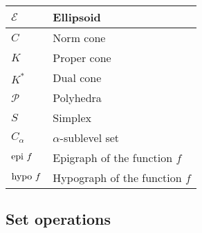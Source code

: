 \documentclass{article}
\begin{document}
\begin{xltabular}{\textwidth}{XX}
    \(\mathcal{E}\) & Ellipsoid \\ \hline
    \(C\) & Norm cone \\ \hline
    \(K\) & Proper cone \\ \hline
    \(K^*\) & Dual cone \\ \hline
    \(\mathcal{P}\) & Polyhedra \\ \hline
    \(S\) & Simplex \\ \hline
    \(C_\alpha\) & \(\alpha\)-sublevel set \\ \hline
    \(\textnormal{epi } f\) & Epigraph of the function \(f\) \\ \hline
    \(\textnormal{hypo } f\) & Hypograph of the function \(f\)
\end{xltabular}

\subsection{Set operations}
\end{document}

